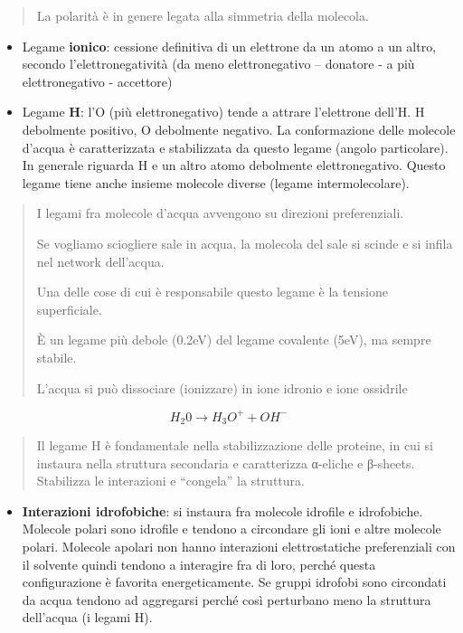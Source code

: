 \begin{quote}
La polarità è in genere legata alla simmetria della molecola.
\end{quote}

\begin{itemize}
\item
  Legame \textbf{ionico}: cessione definitiva di un elettrone da un
  atomo a un altro, secondo l'elettronegatività (da meno elettronegativo
  -- donatore - a più elettronegativo - accettore)
\item
  Legame \textbf{H}: l'O (più elettronegativo) tende a attrare
  l'elettrone dell'H. H debolmente positivo, O debolmente negativo. La
  conformazione delle molecole d'acqua è caratterizzata e stabilizzata
  da questo legame (angolo particolare). In generale riguarda H e un
  altro atomo debolmente elettronegativo. Questo legame tiene anche
  insieme molecole diverse (legame intermolecolare).
\end{itemize}

\begin{quote}
I legami fra molecole d'acqua avvengono su direzioni preferenziali.

Se vogliamo sciogliere sale in acqua, la molecola del sale si scinde e
si infila nel network dell'acqua.

Una delle cose di cui è responsabile questo legame è la tensione
superficiale.

È un legame più debole (0.2eV) del legame covalente (5eV), ma sempre
stabile.

L'acqua si può dissociare (ionizzare) in ione idronio e ione ossidrile
\end{quote}

\[H_{2}0 \rightarrow H_{3}O^{+} + OH^{-}\]

\begin{quote}
Il legame H è fondamentale nella stabilizzazione delle proteine, in cui
si instaura nella struttura secondaria e caratterizza α-eliche e
β-sheets. Stabilizza le interazioni e ``congela'' la struttura.
\end{quote}

\begin{itemize}
\item
  \textbf{Interazioni idrofobiche}: si instaura fra molecole idrofile e
  idrofobiche. Molecole polari sono idrofile e tendono a circondare gli
  ioni e altre molecole polari. Molecole apolari non hanno interazioni
  elettrostatiche preferenziali con il solvente quindi tendono a
  interagire fra di loro, perché questa configurazione è favorita
  energeticamente. Se gruppi idrofobi sono circondati da acqua tendono
  ad aggregarsi perché così perturbano meno la struttura dell'acqua (i
  legami H).
\end{itemize}

